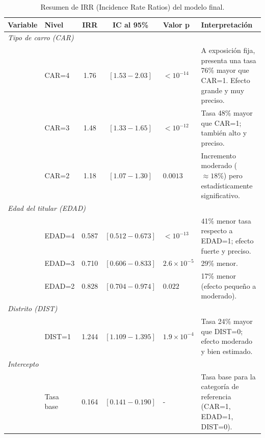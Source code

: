 \begin{table}[h!]
    \centering
    \caption{Resumen de IRR (Incidence Rate Ratios) del modelo final.}
    \label{tab:irr_summary}
    \begin{tabular}{l l c c l p{6cm}}
        \toprule
        \textbf{Variable} & \textbf{Nivel} & \textbf{IRR} & \textbf{IC al 95\%} & \textbf{Valor p} & \textbf{Interpretación} \\
        \midrule
        
        \multicolumn{6}{l}{\textit{Tipo de carro (CAR)}} \\
        & CAR=4 & 1.76 & $[1.53 - 2.03]$ & $< 10^{-14}$ & A exposición fija, presenta una tasa 76\% mayor que CAR=1. Efecto grande y muy preciso. \\
        & CAR=3 & 1.48 & $[1.33 - 1.65]$ & $< 10^{-12}$ & Tasa 48\% mayor que CAR=1; también alto y preciso. \\
        & CAR=2 & 1.18 & $[1.07 - 1.30]$ & $0.0013$ & Incremento moderado ($\approx 18\%$) pero estadísticamente significativo. \\
        \midrule

        \multicolumn{6}{l}{\textit{Edad del titular (EDAD)}} \\
        & EDAD=4 & 0.587 & $[0.512 - 0.673]$ & $< 10^{-13}$ & 41\% menor tasa respecto a EDAD=1; efecto fuerte y preciso. \\
        & EDAD=3 & 0.710 & $[0.606 - 0.833]$ & $2.6 \times 10^{-5}$ & 29\% menor. \\
        & EDAD=2 & 0.828 & $[0.704 - 0.974]$ & $0.022$ & 17\% menor (efecto pequeño a moderado). \\
        \midrule

        \multicolumn{6}{l}{\textit{Distrito (DIST)}} \\
        & DIST=1 & 1.244 & $[1.109 - 1.395]$ & $1.9 \times 10^{-4}$ & Tasa 24\% mayor que DIST=0; efecto moderado y bien estimado. \\
        \midrule

        \multicolumn{6}{l}{\textit{Intercepto}} \\
        & Tasa base & 0.164 & $[0.141 - 0.190]$ & - & Tasa base para la categoría de referencia (CAR=1, EDAD=1, DIST=0). \\
        \bottomrule
    \end{tabular}
\end{table}


